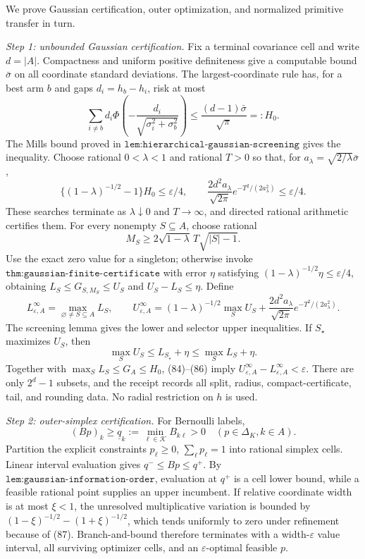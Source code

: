 We prove Gaussian certification, outer optimization, and normalized primitive transfer in turn.

\emph{Step 1: unbounded Gaussian certification.}
Fix a terminal covariance cell and write \(d=|A|\).  Compactness and uniform positive definiteness give a computable bound \(\bar\sigma\) on all coordinate standard deviations.  The largest-coordinate rule has, for a best arm \(b\) and gaps \(d_i=h_b-h_i\), risk at most
\[
\sum_{i\ne b}d_i\Phi\!\left(-\frac{d_i}{\sqrt{\sigma_i^2+\sigma_b^2}}\right)
\leq\frac{(d-1)\bar\sigma}{\sqrt\pi}=:H_0. \tag{83}
\]
The Mills bound proved in \(\texttt{lem:hierarchical-gaussian-screening}\) gives the inequality.  Choose rational \(0<\lambda<1\) and rational \(T>0\) so that, for \(a_\lambda=\sqrt{2/\lambda}\bar\sigma\),
\[
\{(1-\lambda)^{-1/2}-1\}H_0\leq\varepsilon/4,\qquad
\frac{2d^2a_\lambda}{\sqrt{2\pi}}e^{-T^2/(2a_\lambda^2)}\leq\varepsilon/4. \tag{84}
\]
These searches terminate as \(\lambda\downarrow0\) and \(T\to\infty\), and directed rational arithmetic certifies them.  For every nonempty \(S\subseteq A\), choose rational
\[
M_S\geq2\sqrt{1-\lambda}\,T\sqrt{|S|-1}. \tag{85}
\]
Use the exact zero value for a singleton; otherwise invoke \(\texttt{thm:gaussian-finite-certificate}\) with error \(\eta\) satisfying \((1-\lambda)^{-1/2}\eta\leq\varepsilon/4\), obtaining \(L_S\leq G_{S,M_S}\leq U_S\) and \(U_S-L_S\leq\eta\).  Define
\[
L^\infty_{\varepsilon,A}=\max_{\varnothing\ne S\subseteq A}L_S,\qquad
U^\infty_{\varepsilon,A}=(1-\lambda)^{-1/2}\max_SU_S
+\frac{2d^2a_\lambda}{\sqrt{2\pi}}e^{-T^2/(2a_\lambda^2)}. \tag{86}
\]
The screening lemma gives the lower and selector upper inequalities.  If \(S_\star\) maximizes \(U_S\), then
\[
\max_SU_S\leq L_{S_\star}+\eta\leq\max_SL_S+\eta.
\]
Together with \(\max_SL_S\leq G_A\leq H_0\), (84)--(86) imply \(U^\infty_{\varepsilon,A}-L^\infty_{\varepsilon,A}<\varepsilon\).  There are only \(2^d-1\) subsets, and the receipt records all split, radius, compact-certificate, tail, and rounding data.  No radial restriction on \(h\) is used.

\emph{Step 2: outer-simplex certification.}
For Bernoulli labels,
\[
(Bp)_k\geq\underline q_k:=\min_{\ell\in\mathcal K}B_{k\ell}>0
\quad(p\in\Delta_K,k\in A). \tag{87}
\]
Partition the explicit constraints \(p_\ell\geq0\), \(\sum_\ell p_\ell=1\) into rational simplex cells.  Linear interval evaluation gives \(q^-\leq Bp\leq q^+\).  By \(\texttt{lem:gaussian-information-order}\), evaluation at \(q^+\) is a cell lower bound, while a feasible rational point supplies an upper incumbent.  If relative coordinate width is at most \(\xi<1\), the unresolved multiplicative variation is bounded by \((1-\xi)^{-1/2}-(1+\xi)^{-1/2}\), which tends uniformly to zero under refinement because of (87).  Branch-and-bound therefore terminates with a width-\(\varepsilon\) value interval, all surviving optimizer cells, and an \(\varepsilon\)-optimal feasible \(p\).

